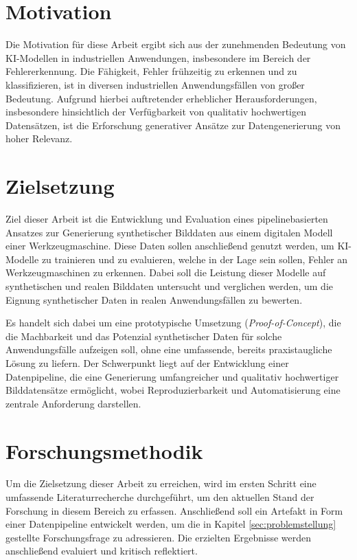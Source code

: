 \section{Motivation}

Die Motivation für diese Arbeit ergibt sich aus der zunehmenden Bedeutung von \ac{KI}-Modellen in industriellen Anwendungen, insbesondere im Bereich der Fehlererkennung. Die Fähigkeit, Fehler frühzeitig zu erkennen und zu klassifizieren, ist in diversen industriellen Anwendungsfällen von großer Bedeutung. Aufgrund hierbei auftretender erheblicher Herausforderungen, insbesondere hinsichtlich der Verfügbarkeit von qualitativ hochwertigen Datensätzen, ist die Erforschung generativer Ansätze zur Datengenerierung von hoher Relevanz.

\section{Zielsetzung}
Ziel dieser Arbeit ist die Entwicklung und Evaluation eines pipelinebasierten Ansatzes zur Generierung synthetischer Bilddaten aus einem digitalen Modell einer Werkzeugmaschine. Diese Daten sollen anschließend genutzt werden, um \ac{KI}-Modelle zu trainieren und zu evaluieren, welche in der Lage sein sollen, Fehler an Werkzeugmaschinen zu erkennen. Dabei soll die Leistung dieser Modelle auf synthetischen und realen Bilddaten untersucht und verglichen werden, um die Eignung synthetischer Daten in realen Anwendungsfällen zu bewerten.

Es handelt sich dabei um eine prototypische Umsetzung (\textit{Proof-of-Concept}), die die Machbarkeit und das Potenzial synthetischer Daten für solche Anwendungsfälle aufzeigen soll, ohne eine umfassende, bereits praxistaugliche Lösung zu liefern. Der Schwerpunkt liegt auf der Entwicklung einer Datenpipeline, die eine Generierung umfangreicher und qualitativ hochwertiger Bilddatensätze ermöglicht, wobei Reproduzierbarkeit und Automatisierung eine zentrale Anforderung darstellen.

\section{Forschungsmethodik}

Um die Zielsetzung dieser Arbeit zu erreichen, wird im ersten Schritt eine umfassende Literaturrecherche durchgeführt, um den aktuellen Stand der Forschung in diesem Bereich zu erfassen. Anschließend soll ein Artefakt in Form einer Datenpipeline entwickelt werden, um die in Kapitel \ref{sec:problemstellung} gestellte Forschungsfrage zu adressieren. Die erzielten Ergebnisse werden anschließend evaluiert und kritisch reflektiert.


